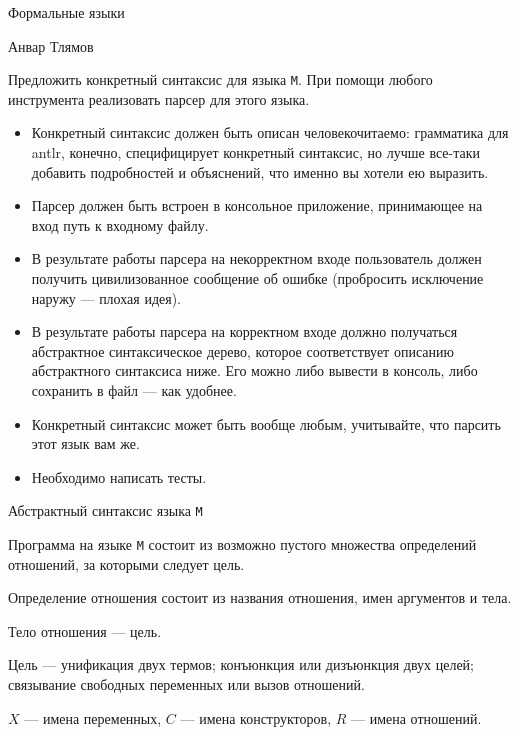 \documentclass[12pt]{article}
\begin{document}
\begin{center}
{\LARGE Формальные языки}

\bigskip

{\Large Анвар Тлямов}
\end{center}

\bigskip

Предложить конкретный синтаксис для языка \verb!M!. При помощи любого инструмента реализовать парсер для этого языка.

\begin{itemize}
  \item Конкретный синтаксис должен быть описан человекочитаемо: грамматика для antlr, конечно, специфицирует конкретный синтаксис, но лучше все-таки добавить подробностей и объяснений, что именно вы хотели ею выразить.
  \item Парсер должен быть встроен в консольное приложение, принимающее на вход путь к входному файлу.
  \item В результате работы парсера на некорректном входе пользователь должен получить цивилизованное сообщение об ошибке (пробросить исключение наружу --- плохая идея).
  \item В результате работы парсера на корректном входе должно получаться абстрактное синтаксическое дерево, которое соответствует описанию абстрактного синтаксиса ниже. Его можно либо вывести в консоль, либо сохранить в файл --- как удобнее.
  \item Конкретный синтаксис может быть вообще любым, учитывайте, что парсить этот язык вам же.
  \item Необходимо написать тесты.
\end{itemize}


\begin{center}
    \Large{Абстрактный синтаксис языка \verb!М!}
\end{center}

Программа на языке \verb!M! состоит из возможно пустого множества определений отношений, за которыми следует цель.

Определение отношения состоит из названия отношения, имен аргументов и тела.

Тело отношения --- цель.

Цель --- унификация двух термов; конъюнкция или дизъюнкция двух целей; связывание свободных переменных или вызов отношений.

$X$ --- имена переменных, $C$ --- имена конструкторов, $R$ --- имена отношений.
\end{document}
